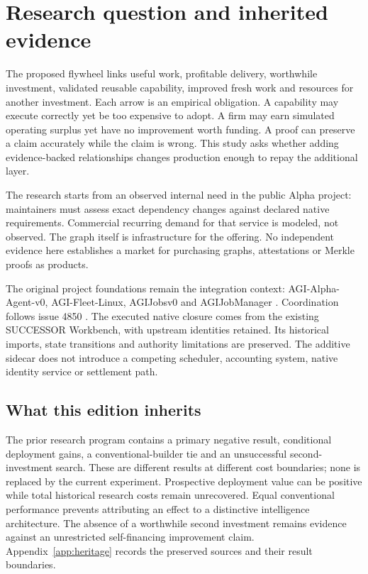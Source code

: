 \documentclass[11pt,a4paper]{article}
\begin{document}
\section{Research question and inherited evidence}
\label{sec:question}
The proposed flywheel links useful work, profitable delivery, worthwhile investment, validated reusable capability, improved fresh work and resources for another investment. Each arrow is an empirical obligation. A capability may execute correctly yet be too expensive to adopt. A firm may earn simulated operating surplus yet have no improvement worth funding. A proof can preserve a claim accurately while the claim is wrong. This study asks whether adding evidence-backed relationships changes production enough to repay the additional layer.

The research starts from an observed internal need in the public Alpha project: maintainers must assess exact dependency changes against declared native requirements. Commercial recurring demand for that service is modeled, not observed. The graph itself is infrastructure for the offering. No independent evidence here establishes a market for purchasing graphs, attestations or Merkle proofs as products.

The original project foundations remain the integration context: AGI-Alpha-Agent-v0, AGI-Fleet-Linux, AGIJobsv0 and AGIJobManager \citep{alpha,fleet,jobs,jobmanager}. Coordination follows issue 4850 \citep{issue4850}. The executed native closure comes from the existing SUCCESSOR Workbench, with upstream identities retained. Its historical imports, state transitions and authority limitations are preserved. The additive sidecar does not introduce a competing scheduler, accounting system, native identity service or settlement path.

\subsection{What this edition inherits}
The prior research program contains a primary negative result, conditional deployment gains, a conventional-builder tie and an unsuccessful second-investment search. These are different results at different cost boundaries; none is replaced by the current experiment. Prospective deployment value can be positive while total historical research costs remain unrecovered. Equal conventional performance prevents attributing an effect to a distinctive intelligence architecture. The absence of a worthwhile second investment remains evidence against an unrestricted self-financing improvement claim. Appendix~\ref{app:heritage} records the preserved sources and their result boundaries.
\end{document}
